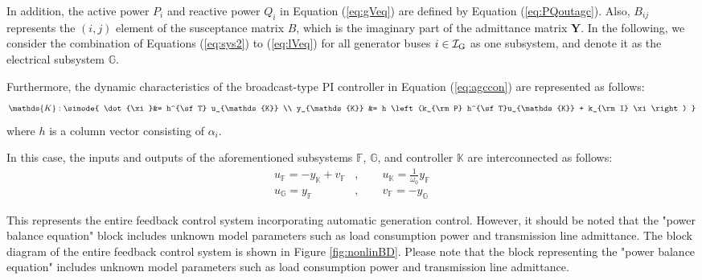 \documentclass[graybox, envcountchap]{svmult}
\begin{document}
In addition, the active power $P_i$ and reactive power $Q_i$ in Equation
(\ref{eq:gVeq}) are defined by Equation (\ref{eq:PQoutagc}). Also, $B_{ij}$
represents the $(i,j)$ element of the susceptance matrix $B$, which is the
imaginary part of the admittance matrix $\bm{Y}$. In the following, we consider
the combination of Equations (\ref{eq:sys2}) to (\ref{eq:lVeq}) for all
generator buses $i \in \mathcal{I}_{\rm G}$ as one subsystem, and denote it as
the electrical subsystem $\mathds{G}$.

Furthermore, the dynamic characteristics of the broadcast-type PI controller in
Equation (\ref{eq:agccon}) are represented as follows:
\begin{equation}\label{eq:condsK}
  \mathds{K}: \simode{
  \dot{\xi}&=  h^{\sf T} u_{\mathds{K}} \\
  y_{\mathds{K}} &= h \left(k_{\rm P} h^{\sf T}u_{\mathds{K}} +  k_{\rm I} \xi \right)
  }
\end{equation}
where $h$ is a column vector consisting of $\alpha_i$.

In this case, the inputs and outputs of the aforementioned subsystems
$\mathds{F}$, $\mathds{G}$, and controller $\mathds{K}$ are interconnected as
follows:
\begin{subequations}\label{eq:connds}
\begin{align}
u_{\mathds{F}} = - y_{\mathds{K}} + v_{\mathds{F}}&
,\qquad u_{\mathds{K}} = \frac{1}{\omega_0} y_{\mathds{F}}	\label{eq:connds1}
\\
u_{\mathds{G}} = y_{\mathds{F}}&
,\qquad
v_{\mathds{F}} = - y_{\mathds{G}}		\label{eq:connds2}
\end{align}
\end{subequations}

This represents the entire feedback control system incorporating automatic
generation control. However, it should be noted that the "power balance
equation" block includes unknown model parameters such as load consumption power
and transmission line admittance. The block diagram of the entire feedback
control system is shown in Figure \ref{fig:nonlinBD}. Please note that the block
representing the "power balance equation" includes unknown model parameters such
as load consumption power and transmission line admittance.
\end{document}
